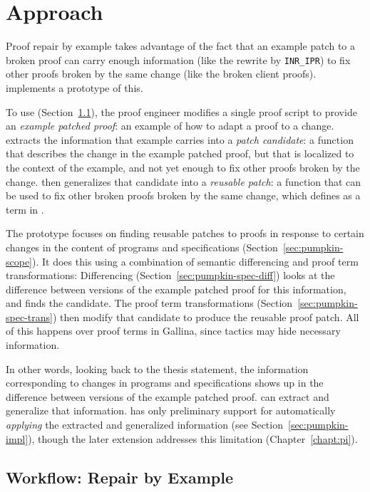 \section{Approach}
\label{sec:pumpkin-approach}

Proof repair by example takes advantage of the fact that an example patch to a broken proof can carry enough 
information (like the rewrite by \lstinline{INR_IPR}) to fix other proofs broken by the same change (like the broken
client proofs). \sysname implements a prototype of this.

To use \sysname (Section~\ref{sec:pumpkin-workflow}), the proof engineer modifies a single proof script to provide 
an \textit{example patched proof}: an example of how to adapt a proof to a change.
\sysname extracts the information that example carries into a \textit{patch candidate}: a function that describes the change 
in the example patched proof,
but that is localized to the context of the example, and not yet enough to fix other proofs broken by the change.
\sysname then generalizes that candidate into a \textit{reusable patch}: a function
that can be used to fix other broken proofs broken by the same change, which \sysname defines as a term in .

The \sysname prototype focuses on finding reusable patches to proofs in response to certain changes in the content of programs and specifications (Section~\ref{sec:pumpkin-scope}).
It does this using a combination of semantic differencing and proof term transformations:
Differencing (Section~\ref{sec:pumpkin-spec-diff}) looks at the difference between versions of the example patched proof for this information, and finds the candidate.
The proof term transformations (Section~\ref{sec:pumpkin-spec-trans}) then modify that candidate to produce the reusable proof patch.
All of this happens over proof terms in Gallina, since tactics may hide necessary information. %

In other words, looking back to the thesis statement, the information corresponding to changes in programs and specifications
shows up in the difference between versions of the example patched proof.
\sysname can extract and generalize that information.
\sysname has only preliminary support for automatically \textit{applying} the extracted
and generalized information (see Section~\ref{sec:pumpkin-impl}),
though the later \toolnamec extension addresses this limitation (Chapter~\ref{chapt:pi}).

\subsection{Workflow: Repair by Example}
\label{sec:pumpkin-workflow}

